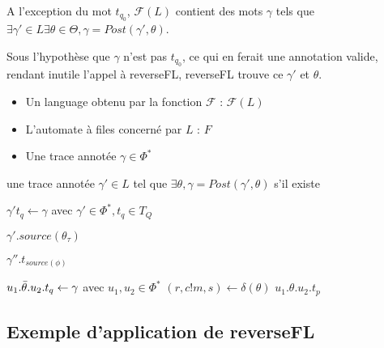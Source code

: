 A l'exception du mot $t_{q_0}$, $\mathcal{F}(L)$ contient des mots $\gamma$ tels que $\exists \gamma'\in L \exists \theta\in\Theta, \gamma=Post(\gamma',\theta)$.

Sous l'hypothèse que $\gamma$ n'est pas $t_{q_0}$, ce qui en ferait une annotation valide, rendant inutile l'appel à reverseFL, reverseFL trouve ce $\gamma'$ et $\theta$.

\begin{algo}[reverseFL]
    \begin{algorithmic}[1]
        \REQUIRE
        \begin{itemize}
            \item Un language obtenu par la fonction $\mathcal{F}$ : $\mathcal{F}(L)$
            \item L'automate à files concerné par $L$  : $F$
            \item Une trace annotée $\gamma\in\Phi^*$
        \end{itemize}
        \ENSURE une trace annotée $\gamma'\in L$ tel que $\exists \theta, \gamma=Post(\gamma',\theta)$ s'il existe

          \STATE $\gamma' t_q \leftarrow \gamma$ avec $\gamma'\in\Phi^*,t_q\in T_Q$

              \RETURN $\gamma'.source(\theta_\tau)$
            \ENDIF
          \ENDIF

              \RETURN $\gamma''.t_{source(\phi)}$
            \ENDIF

              \STATE $u_1.\bar{\theta}.u_2.t_q \leftarrow \gamma$ avec $u_1,u_2 \in \Phi^*$
              \STATE $(r, c!m, s)\leftarrow\delta(\theta)$
                  \RETURN $u_1.\theta.u_2.t_p$
                \ENDIF
              \ENDFOR
            \ENDFOR
          \ENDIF
        \ENDIF
    \end{algorithmic}
\end{algo}


\subsection{Exemple d'application de reverseFL}

